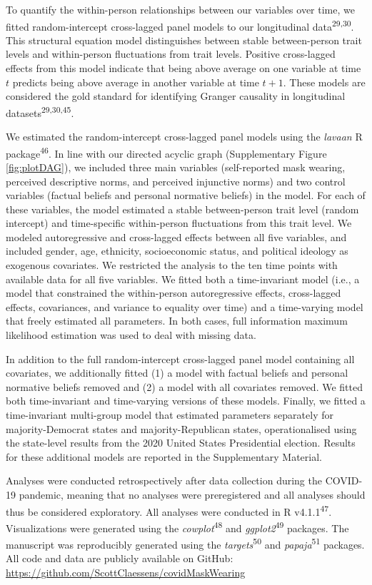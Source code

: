 \documentclass[
  man, donotrepeattitle,floatsintext]{apa6}
\begin{document}
To quantify the within-person relationships between our variables over time, we fitted random-intercept cross-lagged panel models to our longitudinal data\textsuperscript{29,30}. This structural equation model distinguishes between stable between-person trait levels and within-person fluctuations from trait levels. Positive cross-lagged effects from this model indicate that being above average on one variable at time \(t\) predicts being above average in another variable at time \(t + 1\). These models are considered the gold standard for identifying Granger causality in longitudinal datasets\textsuperscript{29,30,45}.

We estimated the random-intercept cross-lagged panel models using the \emph{lavaan} R package\textsuperscript{46}. In line with our directed acyclic graph (Supplementary Figure \ref{fig:plotDAG}), we included three main variables (self-reported mask wearing, perceived descriptive norms, and perceived injunctive norms) and two control variables (factual beliefs and personal normative beliefs) in the model. For each of these variables, the model estimated a stable between-person trait level (random intercept) and time-specific within-person fluctuations from this trait level. We modeled autoregressive and cross-lagged effects between all five variables, and included gender, age, ethnicity, socioeconomic status, and political ideology as exogenous covariates. We restricted the analysis to the ten time points with available data for all five variables. We fitted both a time-invariant model (i.e., a model that constrained the within-person autoregressive effects, cross-lagged effects, covariances, and variance to equality over time) and a time-varying model that freely estimated all parameters. In both cases, full information maximum likelihood estimation was used to deal with missing data.

In addition to the full random-intercept cross-lagged panel model containing all covariates, we additionally fitted (1) a model with factual beliefs and personal normative beliefs removed and (2) a model with all covariates removed. We fitted both time-invariant and time-varying versions of these models. Finally, we fitted a time-invariant multi-group model that estimated parameters separately for majority-Democrat states and majority-Republican states, operationalised using the state-level results from the 2020 United States Presidential election. Results for these additional models are reported in the Supplementary Material.

Analyses were conducted retrospectively after data collection during the COVID-19 pandemic, meaning that no analyses were preregistered and all analyses should thus be considered exploratory. All analyses were conducted in R v4.1.1\textsuperscript{47}. Visualizations were generated using the \emph{cowplot}\textsuperscript{48} and \emph{ggplot2}\textsuperscript{49} packages. The manuscript was reproducibly generated using the \emph{targets}\textsuperscript{50} and \emph{papaja}\textsuperscript{51} packages. All code and data are publicly available on GitHub: \url{https://github.com/ScottClaessens/covidMaskWearing}
\end{document}
